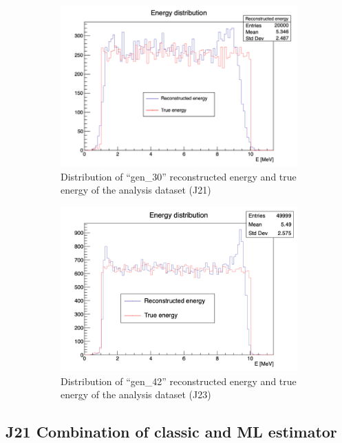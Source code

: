 \documentclass[../main.tex]{subfiles}
\begin{document}
\begin{figure}[ht]
  \centering
  \begin{subfigure}[t]{0.48\linewidth}
    \includegraphics[width=\linewidth]{images/jcnn/vic_cnn/e_dis.png}
    \caption{Distribution of ``gen\_30'' reconstructed energy and true energy of the analysis dataset (J21)}
    \label{fig:jcnn:edis}
  \end{subfigure}
  \hfill
  \begin{subfigure}[t]{0.48\linewidth}
    \includegraphics[width=\linewidth]{images/jcnn/vic_cnn/e_dis_42.png}
    \caption{Distribution of ``gen\_42'' reconstructed energy and true energy of the analysis dataset (J23)}
    \label{fig:jcnn:edis42}
  \end{subfigure}
  \caption{}
\end{figure}


\subsection{J21 Combination of classic and ML estimator}
\label{sec:jcnn:combination}
\end{document}
